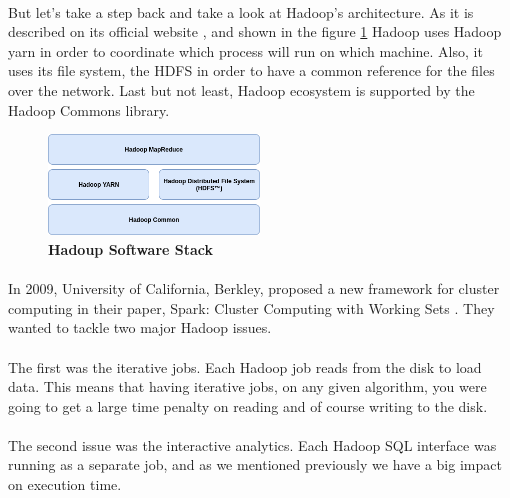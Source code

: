 \paragraph{} But let's take a step back and take a look at Hadoop's architecture. As it is described on its official website \cite{Hadoop:9}, and shown in the figure \ref{hadoopStack} Hadoop uses Hadoop yarn in order to coordinate which process will run on which machine. Also, it uses its file system, the HDFS in order to have a common reference for the files over the network. Last but not least, Hadoop ecosystem is supported by the Hadoop Commons library. \\

\begin{figure}[h]
	\centering
	\includegraphics[width=0.5\textwidth]{../images/hadoop-stack.png}
	\caption{\bfseries Hadoup Software Stack}
	\label{hadoopStack}
\end{figure}

\paragraph{} In 2009, University of California, Berkley, proposed a new framework for cluster computing in their paper, Spark: Cluster Computing with Working Sets \cite{Zaharia:2010:SCC:1863103.1863113}. They wanted to tackle two major Hadoop issues. 

\paragraph{}The first was the iterative jobs. Each Hadoop job reads from the disk to load data. This means that having iterative jobs, on any given algorithm, you were going to get a large time penalty on reading and of course writing to the disk. 

\paragraph{}The second issue was the interactive analytics. Each Hadoop SQL interface was running as a separate job, and as we mentioned previously we have a big impact on execution time.

